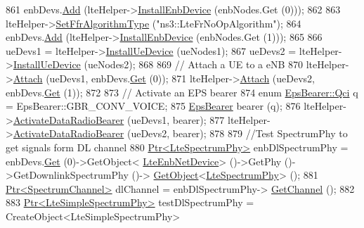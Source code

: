 \begin{DoxyCode}
861   enbDevs.\hyperlink{classns3_1_1NetDeviceContainer_a7ca8bc1d7ec00fd4fcc63869987fbda5}{Add} (lteHelper->\hyperlink{classns3_1_1LteHelper_a5e009ad35ef85f46b5a6099263f15a03}{InstallEnbDevice} (enbNodes.Get (0)));
862 
863   lteHelper->\hyperlink{classns3_1_1LteHelper_a035c6b03305c1511975362f80425b5fc}{SetFfrAlgorithmType} (\textcolor{stringliteral}{"ns3::LteFrNoOpAlgorithm"});
864   enbDevs.\hyperlink{classns3_1_1NetDeviceContainer_a7ca8bc1d7ec00fd4fcc63869987fbda5}{Add} (lteHelper->\hyperlink{classns3_1_1LteHelper_a5e009ad35ef85f46b5a6099263f15a03}{InstallEnbDevice} (enbNodes.Get (1)));
865 
866   ueDevs1 = lteHelper->\hyperlink{classns3_1_1LteHelper_ac9cd932d7de92811cfa953c2e3b2fc9f}{InstallUeDevice} (ueNodes1);
867   ueDevs2 = lteHelper->\hyperlink{classns3_1_1LteHelper_ac9cd932d7de92811cfa953c2e3b2fc9f}{InstallUeDevice} (ueNodes2);
868 
869   \textcolor{comment}{// Attach a UE to a eNB}
870   lteHelper->\hyperlink{classns3_1_1LteHelper_a9466743f826aa2652a87907b7f0a1c87}{Attach} (ueDevs1, enbDevs.\hyperlink{classns3_1_1NetDeviceContainer_a677d62594b5c9d2dea155cc5045f4d0b}{Get} (0));
871   lteHelper->\hyperlink{classns3_1_1LteHelper_a9466743f826aa2652a87907b7f0a1c87}{Attach} (ueDevs2, enbDevs.\hyperlink{classns3_1_1NetDeviceContainer_a677d62594b5c9d2dea155cc5045f4d0b}{Get} (1));
872 
873   \textcolor{comment}{// Activate an EPS bearer}
874   \textcolor{keyword}{enum} \hyperlink{structns3_1_1EpsBearer_aecf0c67109c5eb4ec0b07226fff5885e}{EpsBearer::Qci} q = EpsBearer::GBR\_CONV\_VOICE;
875   \hyperlink{structns3_1_1EpsBearer}{EpsBearer} bearer (q);
876   lteHelper->\hyperlink{classns3_1_1LteHelper_ac896e16cf162e4beeaa292d39ab1b700}{ActivateDataRadioBearer} (ueDevs1, bearer);
877   lteHelper->\hyperlink{classns3_1_1LteHelper_ac896e16cf162e4beeaa292d39ab1b700}{ActivateDataRadioBearer} (ueDevs2, bearer);
878 
879   \textcolor{comment}{//Test SpectrumPhy to get signals form DL channel}
880   \hyperlink{classns3_1_1Ptr}{Ptr<LteSpectrumPhy>} enbDlSpectrumPhy = enbDevs.\hyperlink{classns3_1_1NetDeviceContainer_a677d62594b5c9d2dea155cc5045f4d0b}{Get} (0)->GetObject<
      \hyperlink{classns3_1_1LteEnbNetDevice}{LteEnbNetDevice}> ()->GetPhy ()->GetDownlinkSpectrumPhy ()->
      \hyperlink{classns3_1_1Object_a13e18c00017096c8381eb651d5bd0783}{GetObject}<\hyperlink{classns3_1_1LteSpectrumPhy}{LteSpectrumPhy}> ();
881   \hyperlink{classns3_1_1Ptr}{Ptr<SpectrumChannel>} dlChannel = enbDlSpectrumPhy->
      \hyperlink{classns3_1_1LteSpectrumPhy_a50f13e43568687ee32c5d63e5bf639c2}{GetChannel} ();
882 
883   \hyperlink{classns3_1_1Ptr}{Ptr<LteSimpleSpectrumPhy>} testDlSpectrumPhy = CreateObject<LteSimpleSpectrumPhy>

\end{DoxyCode}
